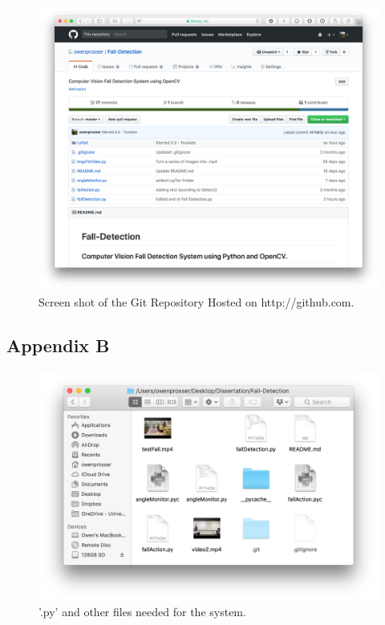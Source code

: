 \documentclass[11pt,a4paper]{report}
\begin{document}
\begin{figure}[H]
 \centering
 \includegraphics[scale = 0.14]{GitRepo.png}
 \caption{Screen shot of the Git Repository Hosted on http://github.com.}
 \label{fig:GitRepo}
\end{figure}

\subsection{Appendix B}

\begin{figure}[H]
 \centering
 \includegraphics[scale = 0.5]{requiredFiles.png}
 \caption{'.py' and other files needed for the system.}
 \label{fig:requiredFiles}
\end{figure}
\end{document}

